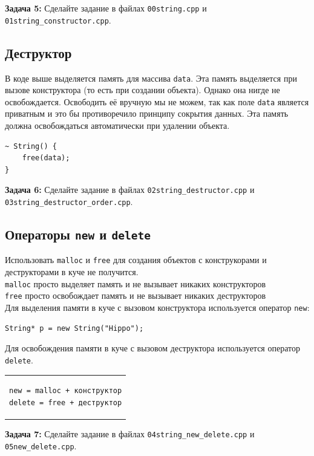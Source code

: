 \documentclass{article}
\begin{document}
\textbf{Задача 5:} Сделайте задание в файлах \texttt{00string.cpp} и \texttt{01string\_constructor.cpp}.
\newpage
\subsection*{Деструктор}
В коде выше выделяется память для массива \texttt{data}. Эта память выделяется при вызове конструктора (то есть при создании объекта). Однако она нигде не освобождается. Освободить её вручную мы не можем, так как поле \texttt{data} является приватным и это бы противоречило принципу сокрытия данных. Эта память должна освобождаться автоматически при удалении объекта.
\begin{lstlisting}
~ String() {
	free(data);
}
\end{lstlisting}
\textbf{Задача 6:} Сделайте задание в файлах \texttt{02string\_destructor.cpp} и \texttt{03string\_destructor\_order.cpp}.

\subsection*{Операторы \texttt{new} и \texttt{delete}}
Использовать \texttt{malloc} и \texttt{free} для создания объектов с конструкорами и деструкторами в куче не получится.\\
\texttt{malloc} просто выделяет память и не вызывает никаких конструкторов\\
\texttt{free} просто освобождает память и не вызывает никаких деструкторов\\
Для выделения памяти в куче с вызовом конструктора используется оператор \texttt{new}:
\begin{lstlisting}
String* p = new String("Hippo");
\end{lstlisting}
Для освобождения памяти в куче с вызовом деструктора используется оператор \texttt{delete}.

\begin{center}
\begin{tabular}{c}
\begin{lstlisting}
new = malloc + конструктор
delete = free + деструктор
\end{lstlisting}
\end{tabular}
\end{center}

\textbf{Задача 7:} Сделайте задание в файлах \texttt{04string\_new\_delete.cpp} и \texttt{05new\_delete.cpp}.
\end{document}
